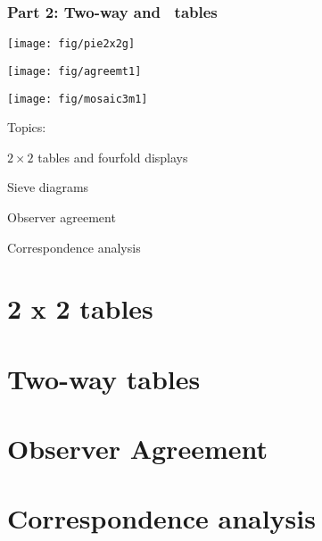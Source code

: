 \renewcommand{\FileName}{vcdpart2}
\begin{frame}
  \frametitle{Part 2: Two-way and \nway\ tables}
 \begin{minipage}[c]{.33\textwidth}
  \texttt{[image: fig/pie2x2g]}
  \end{minipage}%
 \hfill
 \begin{minipage}[c]{.33\textwidth}
  \texttt{[image: fig/agreemt1]}
 \end{minipage}
 \hfill
 \begin{minipage}[c]{.33\textwidth}
  \texttt{[image: fig/mosaic3m1]}
 \end{minipage}

Topics:
  \begin{itemize*}
    \item $2 \times 2$ tables and fourfold displays
	\item Sieve diagrams
	\item Observer agreement
	\item Correspondence analysis
  \end{itemize*}
\end{frame}


\section{2 x 2 tables}

\section{Two-way tables}

\section{Observer Agreement}

\section{Correspondence analysis}


